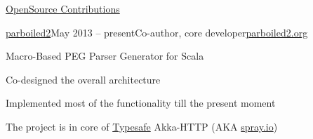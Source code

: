 \documentclass{resume} %
\begin{document}
\begin{rSection}{\href{https://github.com/alexander-myltsev?tab=repositories}{OpenSource Contributions}}

\begin{samepage}
\begin{rSubsection}{\href{http://parboiled2.org}{parboiled2}}{May 2013 -- present}{Co-author, core developer}{\href{http://parboiled2.org}{parboiled2.org}}
\item Macro-Based PEG Parser Generator for Scala
\item Co-designed the overall architecture 
\item Implemented most of the functionality till the present moment
\item The project is in core of \href{http://typesafe.com}{Typesafe} Akka-HTTP (AKA \href{http://spray.io}{spray.io})
\end{rSubsection}
\end{samepage}

\begin{comment}
\begin{samepage}
\begin{rSubsection}{\href{http://russianaicup.ru/}{RussianAI Cup}}{September 2014 -- October 2014}{Core contributor to Scala package}{\href{http://github.com/iSerge/scala-cgdk}{github.com/iSerge/scala-cgdk}}
\item public post about package: \href{http://russianaicup.ru/post/20}{http://russianaicup.ru/post/20}
\end{rSubsection}
\end{samepage}

\begin{samepage}
\begin{rSubsection}{\href{http://github.com/alexander-myltsev/RSlick}{RSlick}}{}{Author}{\href{http://github.com/alexander-myltsev/RSlick}{github.com/alexander-myltsev/RSlick}}
\item R-package for templating and unified access to relational databases
\end{rSubsection}
\end{samepage}

\begin{samepage}
\begin{rSubsection}{\href{http://github.com/alexander-myltsev/sbt-uglify}{sbt-uglify}}{}{Author}{\href{http://github.com/alexander-myltsev/sbt-uglify}{github.com/alexander-myltsev/sbt-uglify}}
\item Scala SBT plugin that compresses JavaScript/mustache files with UglifyJS
\end{rSubsection}
\end{samepage}
\end{comment}


\end{rSection}
\end{document}
